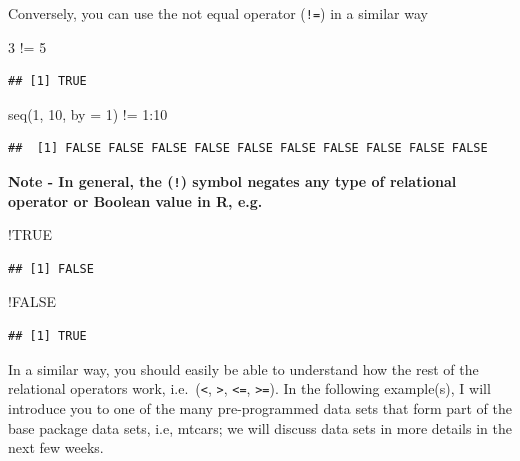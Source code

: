\documentclass[
]{book}
\newenvironment{Shaded}{\begin{snugshade}}{\end{snugshade}}
\newcommand{\AttributeTok}[1]{\textcolor[rgb]{0.77,0.63,0.00}{#1}}
\newcommand{\ConstantTok}[1]{\textcolor[rgb]{0.00,0.00,0.00}{#1}}
\newcommand{\DecValTok}[1]{\textcolor[rgb]{0.00,0.00,0.81}{#1}}
\newcommand{\FunctionTok}[1]{\textcolor[rgb]{0.00,0.00,0.00}{#1}}
\newcommand{\NormalTok}[1]{#1}
\newcommand{\SpecialCharTok}[1]{\textcolor[rgb]{0.00,0.00,0.00}{#1}}
\theoremstyle{definition}
\theoremstyle{definition}
\theoremstyle{definition}
\theoremstyle{definition}
\theoremstyle{remark}
\begin{document}
Conversely, you can use the not equal operator (\texttt{!=}) in a similar way

\begin{Shaded}
\begin{Highlighting}[]
\DecValTok{3} \SpecialCharTok{!=} \DecValTok{5}
\end{Highlighting}
\end{Shaded}

\begin{verbatim}
## [1] TRUE
\end{verbatim}

\begin{Shaded}
\begin{Highlighting}[]
\FunctionTok{seq}\NormalTok{(}\DecValTok{1}\NormalTok{, }\DecValTok{10}\NormalTok{, }\AttributeTok{by =} \DecValTok{1}\NormalTok{) }\SpecialCharTok{!=} \DecValTok{1}\SpecialCharTok{:}\DecValTok{10}
\end{Highlighting}
\end{Shaded}

\begin{verbatim}
##  [1] FALSE FALSE FALSE FALSE FALSE FALSE FALSE FALSE FALSE FALSE
\end{verbatim}

\textbf{Note - In general, the (\texttt{!}) symbol negates any type of relational operator or Boolean value in R, e.g.}

\begin{Shaded}
\begin{Highlighting}[]
\SpecialCharTok{!}\ConstantTok{TRUE}
\end{Highlighting}
\end{Shaded}

\begin{verbatim}
## [1] FALSE
\end{verbatim}

\begin{Shaded}
\begin{Highlighting}[]
\SpecialCharTok{!}\ConstantTok{FALSE}
\end{Highlighting}
\end{Shaded}

\begin{verbatim}
## [1] TRUE
\end{verbatim}

In a similar way, you should easily be able to understand how the rest of the relational operators work, i.e.~(\texttt{\textless{}}, \texttt{\textgreater{}}, \texttt{\textless{}=}, \texttt{\textgreater{}=}). In the following example(s), I will introduce you to one of the many pre-programmed data sets that form part of the base package data sets, i.e, mtcars; we will discuss data sets in more details in the next few weeks.
\end{document}
